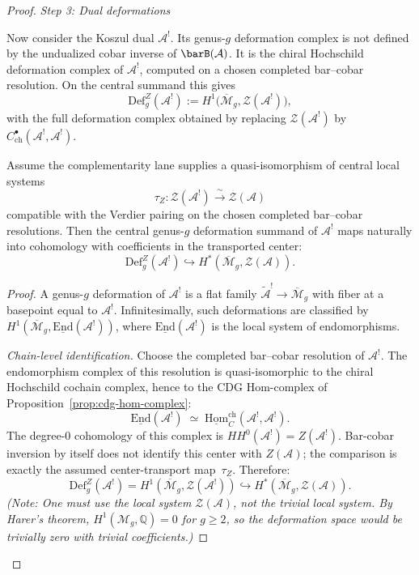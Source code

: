 \begin{proof}
\emph{Step 3: Dual deformations}

Now consider the Koszul dual $\mathcal{A}^!$.  Its genus-$g$
deformation complex is not defined by the undualized cobar inverse of
$\barB(\mathcal A)$.  It is the chiral Hochschild deformation complex
of $\mathcal A^!$, computed on a chosen completed bar--cobar
resolution.  On the central summand this gives
\[
\mathrm{Def}^{Z}_g(\mathcal{A}^!)
 := H^1\bigl(\overline{\mathcal M}_g,
 \mathcal Z(\mathcal A^!)\bigr),
\]
with the full deformation complex obtained by replacing
\(\mathcal Z(\mathcal A^!)\) by
\(C^\bullet_{\mathrm{ch}}(\mathcal A^!,\mathcal A^!)\).

\begin{lemma}\label{lem:deformation-space}
Assume the complementarity lane supplies a quasi-isomorphism of
central local systems
\[
\tau_Z\colon \mathcal Z(\mathcal A^!)\xrightarrow{\;\sim\;}
\mathcal Z(\mathcal A)
\]
compatible with the Verdier pairing on the chosen completed
bar--cobar resolutions. Then the central genus-$g$ deformation
summand of $\mathcal{A}^!$ maps naturally into cohomology with
coefficients in the transported center:
\[
\mathrm{Def}^{Z}_g(\mathcal{A}^!)
\hookrightarrow
H^*(\overline{\mathcal{M}}_g, \mathcal{Z}(\mathcal{A})).
\]
\end{lemma}

\begin{proof}
A genus-$g$ deformation of $\mathcal{A}^!$ is a flat family
$\tilde{\mathcal{A}}^! \to \overline{\mathcal{M}}_g$ with fiber at a
basepoint equal to $\mathcal{A}^!$. Infinitesimally, such deformations
are classified by
$H^1(\overline{\mathcal{M}}_g, \underline{\mathrm{End}}(\mathcal{A}^!))$,
where $\underline{\mathrm{End}}(\mathcal{A}^!)$ is the local system of
endomorphisms.

\emph{Chain-level identification.}
Choose the completed bar--cobar resolution of $\mathcal{A}^!$.
The endomorphism complex of this resolution is quasi-isomorphic to
the chiral Hochschild cochain complex, hence to the CDG Hom-complex
of Proposition~\ref{prop:cdg-hom-complex}:
\[
\underline{\mathrm{End}}(\mathcal{A}^!)
\;\simeq\;
\underline{\mathrm{Hom}}_C^{\mathrm{ch}}(\mathcal{A}^!, \mathcal{A}^!).
\]
The degree-$0$ cohomology of this complex is
$HH^0(\mathcal{A}^!) = Z(\mathcal{A}^!)$.  Bar-cobar inversion by
itself does not identify this center with $Z(\mathcal A)$; the
comparison is exactly the assumed center-transport map~$\tau_Z$.
Therefore:
\[
\mathrm{Def}^{Z}_g(\mathcal{A}^!)
= H^1(\overline{\mathcal{M}}_g, \mathcal{Z}(\mathcal{A}^!))
\hookrightarrow H^*(\overline{\mathcal{M}}_g, \mathcal{Z}(\mathcal{A})).
\]
\emph{(Note: One must use the local system $\mathcal{Z}(\mathcal{A})$,
not the trivial local system. By Harer's theorem,
$H^1(\mathcal{M}_g, \mathbb{Q}) = 0$ for $g \geq 2$, so the
deformation space would be trivially zero with trivial coefficients.)}
\end{proof}


\end{proof}
